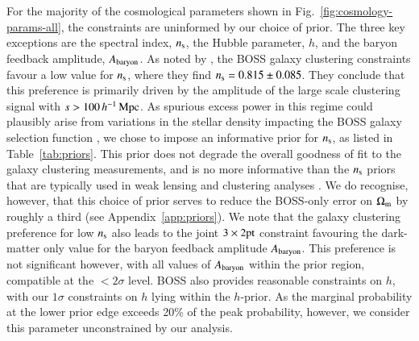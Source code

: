 For the majority of the cosmological parameters shown in Fig.~\ref{fig:cosmology-params-all}, the constraints are uninformed by our choice of prior.  The three key exceptions are the spectral index, $n_{\rm s}$, the Hubble parameter, $h$, and the baryon feedback amplitude, $A_{\rm baryon}$.  As noted by \citet{troester/etal:2020}, the BOSS galaxy clustering constraints favour a low value for $n_{\rm s}$, where they find $n_{\rm s} = 0.815 \pm 0.085$.  They conclude that this preference is primarily driven by the amplitude of the large scale clustering signal with $s > 100 \, h^{-1}\, {\rm Mpc}$.  As spurious excess power in this regime could plausibly arise from variations in the stellar density impacting the BOSS galaxy selection function \citep{ross/etal:2017}, we chose to impose an informative prior for $n_{\rm s}$, as listed in Table~\ref{tab:priors}.   This prior does not degrade the overall goodness of fit to the galaxy clustering measurements, and is no more informative than the $n_{\rm s}$ priors that are typically used in weak lensing and clustering analyses \citep[see for example][]{sanchez/etal:2017,abbott/etal:2018}.  We do recognise, however, that this choice of prior serves to reduce the BOSS-only error on $\Omega_{\rm m}$ by roughly a third (see Appendix~\ref{app:priors}).   We note that the galaxy clustering preference for low $n_{\rm s}$ also leads to the joint $3\times2{\rm pt}$ constraint favouring the dark-matter only value for the baryon feedback amplitude $A_{\rm baryon}$.   This preference is not significant however, with all values of $A_{\rm baryon}$ within the prior region, compatible at the $<2 \sigma$ level.   BOSS also provides reasonable constraints on $h$, with our $1\sigma$ constraints on $h$ lying within the $h$-prior.   As the marginal probability at the lower prior edge exceeds 20\% of the peak probability, however, we consider this parameter unconstrained by our analysis.

